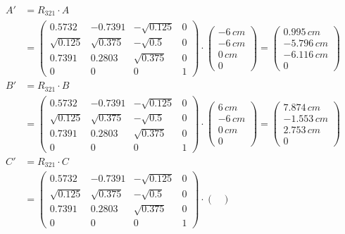 \begin{align*}
A' &= R_{321} \cdot A \\
&= 
\begin{pmatrix}
0.5732  & -0.7391 & -\sqrt{0.125}& 0 \\
\sqrt{0.125} & \sqrt{0.375} & -\sqrt{0.5} & 0 \\
0.7391 & 0.2803 & \sqrt{0.375} & 0 \\
0 & 0 & 0 & 1 
\end{pmatrix}
\cdot 
\begin{pmatrix}
- 6\,cm \\
- 6\,cm \\
0\,cm \\
0
\end{pmatrix}
=
\begin{pmatrix}
0.995\,cm \\
-5.796\,cm \\
-6.116\,cm \\
0
\end{pmatrix}\\
B' &= R_{321} \cdot B \\
&= 
\begin{pmatrix}
0.5732  & -0.7391 & -\sqrt{0.125}& 0 \\
\sqrt{0.125} & \sqrt{0.375} & -\sqrt{0.5} & 0 \\
0.7391 & 0.2803 & \sqrt{0.375} & 0 \\
0 & 0 & 0 & 1 
\end{pmatrix}
\cdot 
\begin{pmatrix}
6\,cm \\
- 6\,cm \\
0\,cm \\
0
\end{pmatrix}
=
\begin{pmatrix}
7.874\,cm \\
-1.553\,cm \\
2.753\,cm \\
0
\end{pmatrix}\\
C' &= R_{321} \cdot C \\
&= 
\begin{pmatrix}
0.5732  & -0.7391 & -\sqrt{0.125}& 0 \\
\sqrt{0.125} & \sqrt{0.375} & -\sqrt{0.5} & 0 \\
0.7391 & 0.2803 & \sqrt{0.375} & 0 \\
0 & 0 & 0 & 1 
\end{pmatrix}
\cdot 
\begin{pmatrix}

\end{pmatrix}
\end{align*}
